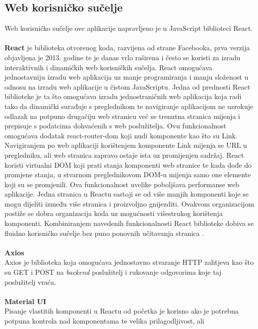 \documentclass[times, utf8, zavrsni]{fer}
\begin{document}
\subsection{Web korisničko sučelje}
Web korisničko sučelje ove aplikacije napravljeno je u JavaScript biblioteci React. 
\\
\\ \textbf{React} je biblioteka otvorenog koda, razvijena od strane Facebooka,
prva verzija objavljena je 2013. godine te je danas vrlo raširena i često se koristi za izradu interaktivnih i dinamičkih web korisničkih sučelja. 
React omogućava jednostavniju izradu web aplikacija uz manje programiranja i manju složenost u odnosu na izradu web aplikacije u čistom JavaScriptu.
Jedna od prednosti React biblioteke je ta što omogućava izradu jednostraničnih web aplikacija  koja radi tako 
da dinamički surađuje s preglednikom te navigiranje aplikacijom ne uzrokuje odlazak na potpuno drugačiju web stranicu već se trenutna stranica 
mijenja i prepisuje s podatcima dohvaćenih s web poslužitelja. Ovu funkcionalnost omogućava dodatak react-router-dom koji nudi komponente kao što su Link.
Navigiranjem po web aplikaciji korištenjem komponente Link mijenja se URL u pregledniku, ali web stranica zapravo ostaje ista uz promijenjen sadržaj.
React koristi virtualni DOM  koji prati stanja 
komponenti web stranice te kada dođe do promjene stanja, u stvarnom preglednikovom DOM-u mijenja samo one elemente koji su se promjenili. Ova 
funkcionalnost uvelike poboljšava performanse web aplikacije.
Jedna stranica u Reactu sastoji se od više manjih komponenti koje se mogu dijeliti između više stranica i proizvoljno gnijezditi. Ovakvom organizacijom
postiže se dobra organizacija koda uz mogućnosti višestrukog korištenja komponenti.
Kombiniranjem navedenih funkcionalnosti React biblioteke dobiva se fluidno korisničko sučelje bez puno ponovnih učitavanja stranica .
\\
\\ \textbf{Axios}
\\ Axios je biblioteka koja omogućava jednostavno stvaranje HTTP zahtjeva kao što su GET i POST na \emph{backend} poslužitelj i rukovanje odgovorima koje taj poslužitelj vraća.
\\
\\ \textbf{Material UI}
\\ Pisanje vlastitih komponenti u Reactu od početka je korisno ako je potrebna potpuna kontrola nad komponentama te velika prilagodljivost, ali
\end{document}
